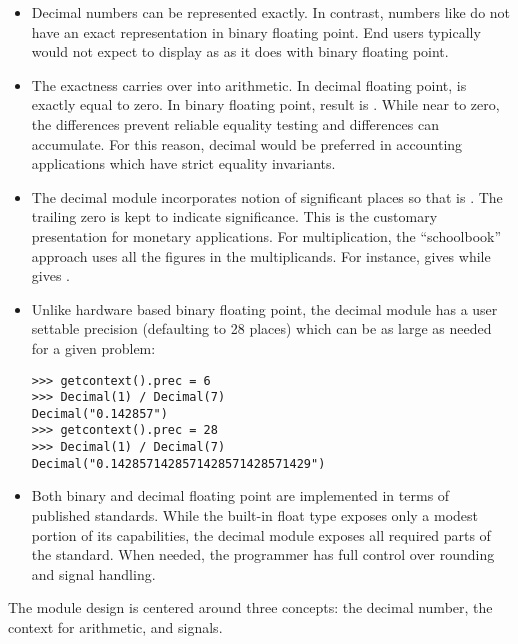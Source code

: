 \begin{itemize}

\item Decimal numbers can be represented exactly.  In contrast, numbers like
 do not have an exact representation in binary floating point.
End users typically would not expect  to display as
 as it does with binary floating point.

\item The exactness carries over into arithmetic.  In decimal floating point,
 is exactly equal to zero.  In binary floating
point, result is .  While near to zero, the
differences prevent reliable equality testing and differences can accumulate.
For this reason, decimal would be preferred in accounting applications which
have strict equality invariants.

\item The decimal module incorporates notion of significant places so that
 is .  The trailing zero is kept to indicate
significance.  This is the customary presentation for monetary applications. For
multiplication, the ``schoolbook'' approach uses all the figures in the
multiplicands.  For instance,  gives  while
 gives .

\item Unlike hardware based binary floating point, the decimal module has a user
settable precision (defaulting to 28 places) which can be as large as needed for
a given problem:

\begin{verbatim}
>>> getcontext().prec = 6
>>> Decimal(1) / Decimal(7)
Decimal("0.142857")
>>> getcontext().prec = 28
>>> Decimal(1) / Decimal(7)
Decimal("0.1428571428571428571428571429")
\end{verbatim}

\item Both binary and decimal floating point are implemented in terms of published
standards.  While the built-in float type exposes only a modest portion of its
capabilities, the decimal module exposes all required parts of the standard.
When needed, the programmer has full control over rounding and signal handling.

\end{itemize}


The module design is centered around three concepts:  the decimal number, the
context for arithmetic, and signals.

